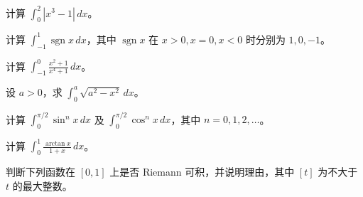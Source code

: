 \noindent\begin{minipage}{\textwidth}
计算 $\displaystyle\int_0^2|x^3-1|\,dx$。
\end{minipage}\par\vfill
\newpage
\noindent\begin{minipage}{\textwidth}
计算 $\displaystyle\int_{-1}^1\operatorname{sgn}x\,dx$，其中 $\operatorname{sgn}x$ 在 $x>0,x=0,x<0$ 时分别为 $1,0,-1$。
\end{minipage}\par\vfill
\noindent\begin{minipage}{\textwidth}
计算 $\displaystyle\int_{-1}^0\frac{x^2+1}{x^4+1}\,dx$。
\end{minipage}\par\vfill
\noindent\begin{minipage}{\textwidth}
设 $a>0$，求 $\displaystyle\int_0^a\sqrt{a^2-x^2}\,dx$。
\end{minipage}\par\vfill
\noindent\begin{minipage}{\textwidth}
计算 $\displaystyle\int_0^{\pi/2}\sin^n x\,dx$ 及 $\displaystyle\int_0^{\pi/2}\cos^n x\,dx$，其中 $n=0,1,2,\ldots$。
\end{minipage}\par\vfill
\newpage
\noindent\begin{minipage}{\textwidth}
计算 $\displaystyle\int_0^1\frac{\arctan x}{1+x}\,dx$。
\end{minipage}\par\vfill
\newpage
\noindent\begin{minipage}{\textwidth}
判断下列函数在 $[0,1]$ 上是否 Riemann 可积，并说明理由，其中 $[t]$ 为不大于 $t$ 的最大整数。
\end{minipage}\par\vfill
